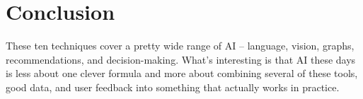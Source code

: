 \documentclass[11pt]{article}
\begin{document}
\section{Conclusion}

These ten techniques cover a pretty wide range of AI -- language, vision, graphs, recommendations, and decision-making. What's interesting is that AI these days is less about one clever formula and more about combining several of these tools, good data, and user feedback into something that actually works in practice.
\end{document}

